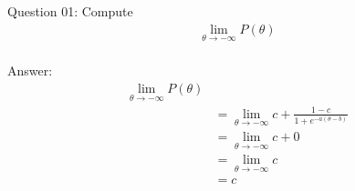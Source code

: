 \documentclass[10pt,a4paper]{article}
\author{Daniel Frederico Lins Leite}
\begin{document}
	Question 01:
	Compute\\
	\begin{align*}
		\lim_{\theta \to -\infty} P(\theta)
	\end{align*}
	\\
	Answer:
	\begin{align*}
		\lim_{\theta \to -\infty} P(\theta)\\
		&=\lim_{\theta \to -\infty} {c + \frac{1-c}{1+e^{-a(\theta - b)}}}\\
		&=\lim_{\theta \to -\infty} {c + 0}\\
		&=\lim_{\theta \to -\infty} {c}\\
		&=c
	\end{align*}
\end{document}

